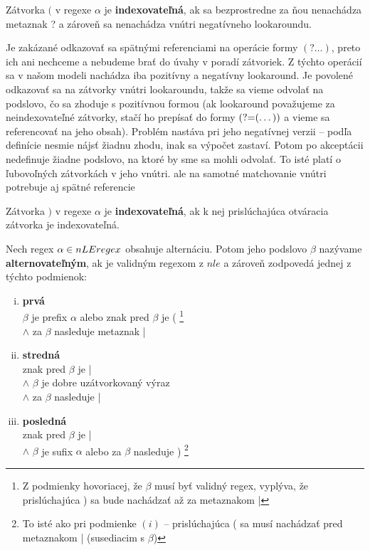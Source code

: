 \begin{df}
Zátvorka $($ v regexe $\alpha$ je \textbf{indexovateľná}, ak sa bezprostredne za ňou nenachádza metaznak ? a zároveň sa nenachádza vnútri negatívneho lookaroundu.
\end{df}
Je zakázané odkazovať sa spätnými referenciami na operácie formy $(?\dots )$, preto ich ani nechceme a nebudeme brať do úvahy v poradí zátvoriek. Z týchto operácií sa v našom modeli nachádza iba pozitívny a negatívny lookaround. Je povolené odkazovať sa na zátvorky vnútri lookaroundu, takže sa vieme odvolať na podslovo, čo sa zhoduje s pozitívnou formou (ak lookaround považujeme za neindexovateľné zátvorky, stačí ho prepísať do formy $\text{(?=} (\dots ))$ a vieme sa referencovať na jeho obsah). Problém nastáva pri jeho negatívnej verzii -- podľa definície nesmie nájsť žiadnu zhodu, inak sa výpočet zastaví. Potom po akceptácii nedefinuje žiadne podslovo, na ktoré by sme sa mohli odvolať. To isté platí o ľubovoľných zátvorkách v jeho vnútri.
\TODO ale na samotné matchovanie vnútri potrebuje aj spätné referencie

\begin{df}
Zátvorka $)$ v regexe $\alpha$ je \textbf{indexovateľná}, ak k nej prislúchajúca otváracia zátvorka je indexovateľná.
\end{df}

\begin{df}
Nech regex $\alpha \in nLEregex$ obsahuje alternáciu. Potom jeho podslovo $\beta$ nazývame \textbf{alternovateľným}, ak je validným regexom z $nle$ a zároveň zodpovedá jednej z týchto podmienok:
\begin{enumerate}[(i)]
\item \textbf{prvá} \\ $\beta$ je prefix $\alpha$ alebo znak pred $\beta$ je ( \footnote{Z podmienky hovoriacej, že $\beta$ musí byť validný regex, vyplýva, že prislúchajúca ) sa bude nachádzať až za metaznakom |} 
\\ $\wedge$ za $\beta$ nasleduje metaznak |
\item \textbf{stredná} \\ znak pred $\beta$ je | \\ $\wedge$ $\beta$ je dobre uzátvorkovaný výraz \\ $\wedge$ za $\beta$ nasleduje |
\item \textbf{posledná} \\ znak pred $\beta$ je | \\
$\wedge$ $\beta$ je sufix $\alpha$ alebo za $\beta$ nasleduje ) \footnote{To isté ako pri podmienke $(i)$ -- prislúchajúca ( sa musí nachádzať pred metaznakom | (susediacim s $\beta$)}
\end{enumerate}
\end{df}

